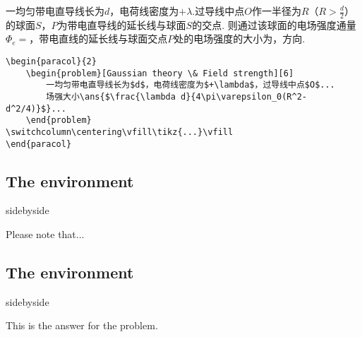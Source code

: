 \begin{paracol}{2}
\begin{problem}
    一均匀带电直导线长为$d$，电荷线密度为$+\lambda$.过导线中点$O$作一半径为$R$（$R>\frac{d}{2}$）的球面$S$，$P$为带电直导线的延长线与球面$S$的交点. 则通过该球面的电场强度通量$\Phi_e=$，带电直线的延长线与球面交点$P$处的电场强度的大小为，方向.
    \end{problem}
\switchcolumn\centering
\vfill
{}
\vfill
\end{paracol}
\begin{verbatim}
\begin{paracol}{2}
    \begin{problem}[Gaussian theory \& Field strength][6]
        一均匀带电直导线长为$d$，电荷线密度为$+\lambda$，过导线中点$O$...
        场强大小\ans{$\frac{\lambda d}{4\pi\varepsilon_0(R^2-d^2/4)}$}...
    \end{problem}
\switchcolumn\centering\vfill\tikz{...}\vfill
\end{paracol}
\end{verbatim}

\subsection{The  environment}
\begin{tcblisting}{sidebyside}
\begin{note}
    Please note that...
\end{note}
\end{tcblisting}

\subsection{The  environment}
\begin{tcblisting}{sidebyside}
\begin{solution}
    This is the answer for the problem.
\end{solution}
\end{tcblisting}


